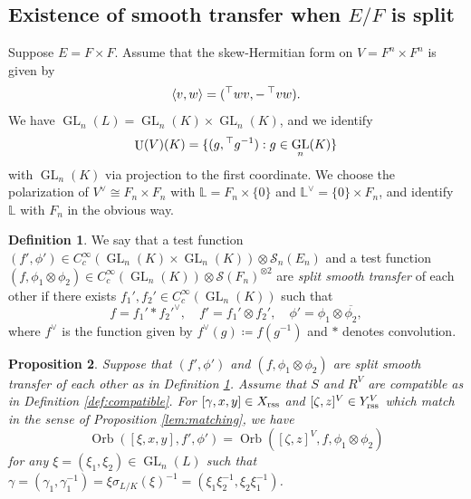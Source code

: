 \documentclass[11pt, reqno]{amsart}
\numberwithin{equation}{subsection}
\theoremstyle{plain}
\newtheorem{proposition}{Proposition}[subsection]
\theoremstyle{definition}
\newtheorem{definition}[proposition]{Definition}
\newcommand{\LL}{\mathbb L}
\newcommand{\ol}{\overline}
\newcommand{\cS}{\mathcal S}
\DeclareMathOperator{\GL}{GL}
\DeclareMathOperator{\Orb}{Orb}
\DeclareMathOperator{\U}{U}
\newcommand{\transp}{\prescript{\top}{}{}}
\newcommand{\rss}{\textnormal{rss}}
\begin{document}
\subsection{Existence of smooth transfer when $E/F$ is split}
\label{sec:splittransfer}
Suppose $E = F \times F$. Assume that the skew-Hermitian
form on $V = F^n \times F^n$ is given by
\[
    \langle v, w \rangle =
    (\transp{w}v, -\transp{v}w).
\]
We have $\GL_n(L) = \GL_n(K) \times \GL_n(K)$,
and we identify
\[
    \U(V)(K) = \{(g, \transp{g^{-1}}) : g
    \in \GL_n(K)\}
\]
with $\GL_n(K)$ via projection to the first coordinate.
We choose the polarization of
$V^\vee \cong F_n \times F_n$ with
$\LL = F_n \times \{0\}$ and
$\LL^\vee = \{0\} \times F_n$,
and identify $\LL$ with $F_n$ in the obvious way.

\begin{definition}
\label{def:splittransfer}
We say that a test function $(f', \phi') 
\in C_c^\infty(\GL_n(K) \times
\GL_n(K)) \otimes \cS_n(E_n)$ and
a test function $(f, \phi_1 \otimes \phi_2) \in
C_c^\infty(\GL_n(K)) \otimes \cS(F_n)^{\otimes 2}$
are \emph{split smooth transfer} of each other 
if there exists $f_1', f_2' \in C_c^\infty(\GL_n(K))$
such that 
\[
    f = f_1' \ast f_2'^\vee, \quad
    f' = f_1' \otimes f_2', \quad
    \phi' = \phi_1 \otimes \ol{\phi_2},
\]
where $f^\vee$ is the function given by
$f^\vee(g) \coloneqq f(g^{-1})$ and $\ast$
denotes convolution.
\end{definition}

\begin{proposition}
\label{prop:splittransfer}
Suppose that $(f', \phi')$ and $(f, \phi_1 \otimes
\phi_2)$ are split smooth transfer of each
other as in Definition \ref{def:splittransfer}.
Assume that $S$ and $R^V$ are compatible as in
Definition \ref{def:compatible}. For $[\gamma, x, y] \in X_\rss$
and $[\zeta, z]^V \in Y_\rss^V$ which match
in the sense of Proposition \ref{lem:matching}, 
we have
\[
    \Orb([\xi, x, y], f', \phi')
    = \Orb([\zeta, z]^V, f, \phi_1 \otimes \phi_2)
\]
for any $\xi = (\xi_1, \xi_2) \in \GL_n(L)$ such
that $\gamma = (\gamma_1, \gamma_1^{-1}) = 
\xi\sigma_{L/K}(\xi)^{-1} = (\xi_1\xi_2^{-1},
\xi_2\xi_1^{-1})$.
\end{proposition}   
\end{document}
